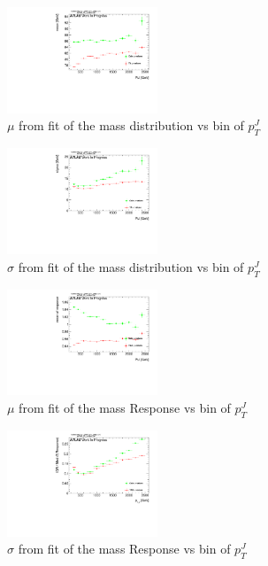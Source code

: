 \begin{figure}

\includegraphics[width=0.4\textwidth]{appendixB/mTAS_W_calibmCal_20:07:01-03-11-2016/5graph_h_FatJet_ptJ12m_meanMvsTA.pdf}
\caption{$\mu$ from fit of the mass distribution vs bin of $p_{T}^{J}$ }

\end{figure}

\begin{figure}

\includegraphics[width=0.4\textwidth]{appendixB/mTAS_W_calibmCal_20:07:01-03-11-2016/6graph_h_FatJet_ptJ12m_sigmaMvsTA.pdf}
\caption{$\sigma$ from fit of the mass distribution vs bin of $p_{T}^{J}$ }

\end{figure}

\clearpage

\begin{figure}

\includegraphics[width=0.4\textwidth]{appendixB/mTAS_W_calibmCal_20:07:01-03-11-2016/71graph_h_JetRatio_mJ12CALO_meanResponseMvsTA.pdf}
\caption{$\mu $ from fit of the mass Response vs bin of  $p_{T}^{J}$}

\end{figure}
\begin{figure}

\includegraphics[width=0.4\textwidth]{appendixB/mTAS_W_calibmCal_20:07:01-03-11-2016/72graph_h_JetRatio_mJ12CALO_sigmaResponseMvsTA.pdf}
\caption{$\sigma $ from fit of the mass Response vs bin of $p_{T}^{J}$}

\end{figure}


